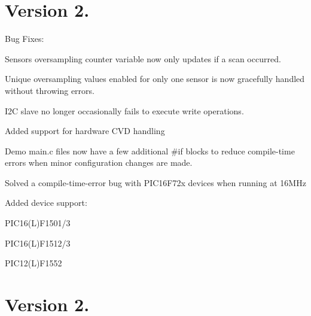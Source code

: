 \hypertarget{_changelog_cl020101}{}\section{Version 2.}\label{_changelog_cl020101}
\begin{DoxyItemize}
\item Bug Fixes\+: 
\begin{DoxyItemize}
\item Sensors\textquotesingle{} oversampling counter variable now only updates if a scan occurred. 
\item Unique oversampling values enabled for only one sensor is now gracefully handled without throwing errors. 
\item I2\+C slave no longer occasionally fails to execute write operations. 
\end{DoxyItemize}\item Added support for hardware C\+V\+D handling \item Demo main.\+c files now have a few additional \#if blocks to reduce compile-\/time errors when minor configuration changes are made. \item Solved a compile-\/time-\/error bug with P\+I\+C16\+F72x devices when running at 16\+M\+Hz \item Added device support\+: 
\begin{DoxyItemize}
\item P\+I\+C16(\+L)F1501/3 
\item P\+I\+C16(\+L)F1512/3 
\item P\+I\+C12(\+L)F1552 
\end{DoxyItemize}\end{DoxyItemize}
\hypertarget{_changelog_cl0201}{}\section{Version 2.}\label{_changelog_cl0201}
